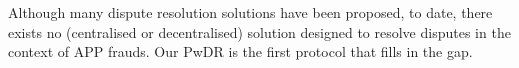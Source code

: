 


 

Although many dispute resolution solutions have been proposed, to date, there exists no  (centralised or decentralised) solution  designed to resolve disputes in the context of APP frauds.  Our PwDR is the first protocol that fills in the gap. 

 



